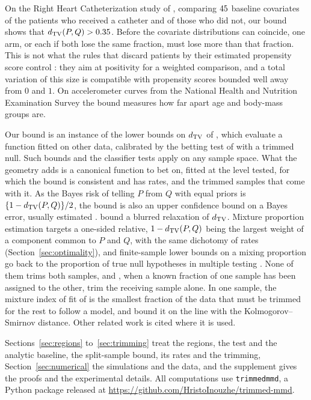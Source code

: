 On the Right Heart Catheterization study of \citet{connors1996rhc}, comparing $45$ baseline covariates of
the patients who received a catheter and of those who did not, our bound shows that $d_{\mathrm{TV}}(P,Q)>0.35$.
Before the covariate distributions can coincide, one arm, or each if both lose the same fraction, must lose more than
that fraction. This is not what the rules that discard patients by their estimated propensity score control
\citep{crump2009overlap,lei2021overlap,damour2021overlap}: they aim at positivity for a weighted comparison, and a total
variation of this size is compatible with propensity scores bounded well away from $0$ and $1$. On accelerometer curves from the National Health and Nutrition Examination Survey the bound measures how
far apart age and body-mass groups are.

Our bound is an instance of the lower bounds on $d_{\mathrm{TV}}$ of \citet{naf2022hplb}, which evaluate a function fitted on
other data, calibrated by the betting test of \citet{shekhar2024nonparametric} with a trimmed null. Such bounds and the
classifier tests \citep{lopezpaz2017revisiting,kim2021classification} apply on any sample space. What the geometry adds
is a canonical function to bet on, fitted at the level tested, for which the bound is consistent and has rates, and
the trimmed samples that come with it. As the Bayes risk of telling $P$ from $Q$ with equal priors is
$\{1-d_{\mathrm{TV}}(P,Q)\}/2$, the bound is also an upper confidence bound on a Bayes error, usually estimated
\citep{berisha2016empirically,noshad2019learning,theisen2021evaluating}. \citet{horebarber2026blurred} bound a blurred
relaxation of $d_{\mathrm{TV}}$. Mixture proportion estimation \citep{blanchard2010semi,scott2015rate,ramaswamy2016mixture} targets a
one-sided relative, $1-d_{\mathrm{TV}}(P,Q)$ being the largest weight of a component common to $P$ and $Q$, with the same dichotomy
of rates (Section~\ref{sec:optimality}), and finite-sample lower bounds on a mixing proportion go back to the
proportion of true null hypotheses in multiple testing
\citep{genovese2004stochastic,meinshausen2006estimating,patra2016estimation}. None of them trims both samples, and
\citet{nafshi2024partial}, when a known fraction of one sample has been assigned to the other, trim the receiving sample
alone. In one sample, the mixture index of fit of \citet{rudas1994index} \citep[see also][]{liu2009tolerance} is the
smallest fraction of the data that must be trimmed for the rest to follow a model, and \citet{delbarrio2020ks} bound it
on the line with the Kolmogorov--Smirnov distance. Other related work is cited where it is used.

Sections~\ref{sec:regions} to~\ref{sec:trimming} treat the regions, the test and the analytic baseline, the
split-sample bound, its rates and the trimming, Section~\ref{sec:numerical} the simulations and the data, and the
supplement gives the proofs and the experimental details. All computations use \texttt{trimmedmmd}, a Python package
released at \url{https://github.com/HristoInouzhe/trimmed-mmd}.
